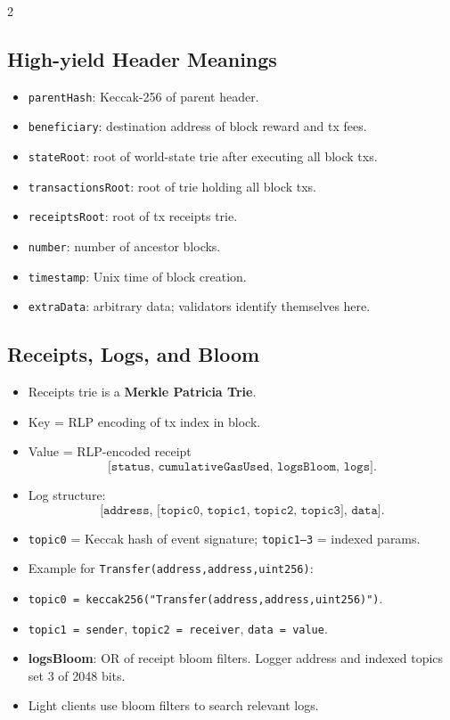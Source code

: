 \documentclass[10pt,a4paper]{article}
\newcommand{\term}[1]{\textbf{#1}}
\newcommand{\code}[1]{\texttt{#1}}
\begin{document}
\begin{multicols*}{2}
\subsection*{High-yield Header Meanings}
\begin{itemize}
\item \code{parentHash}: Keccak-256 of parent header.
\item \code{beneficiary}: destination address of block reward and tx fees.
\item \code{stateRoot}: root of world-state trie after executing all block txs.
\item \code{transactionsRoot}: root of trie holding all block txs.
\item \code{receiptsRoot}: root of tx receipts trie.
\item \code{number}: number of ancestor blocks.
\item \code{timestamp}: Unix time of block creation.
\item \code{extraData}: arbitrary data; validators identify themselves here.
\end{itemize}

\subsection*{Receipts, Logs, and Bloom}
\begin{itemize}
\item Receipts trie is a \term{Merkle Patricia Trie}.
\item Key = RLP encoding of tx index in block.
\item Value = RLP-encoded receipt
\[
\code{[status, cumulativeGasUsed, logsBloom, logs]}.
\]
\item Log structure:
\[
\code{[address, [topic0, topic1, topic2, topic3], data]}.
\]
\item \code{topic0} = Keccak hash of event signature; \code{topic1--3} = indexed params.
\item Example for
\code{Transfer(address,address,uint256)}:
\item \code{topic0 = keccak256("Transfer(address,address,uint256)")}.
\item \code{topic1 = sender}, \code{topic2 = receiver}, \code{data = value}.
\item \term{logsBloom}: OR of receipt bloom filters. Logger address and indexed topics set 3 of 2048 bits.
\item Light clients use bloom filters to search relevant logs.
\end{itemize}


\end{multicols*}
\end{document}
